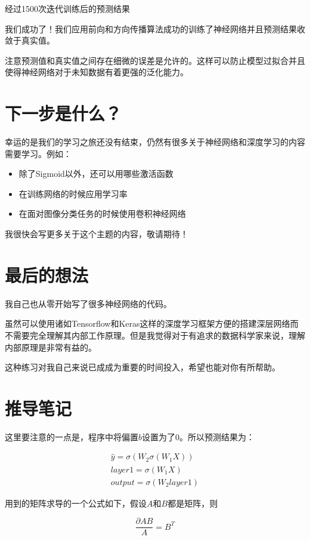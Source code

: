 经过1500次迭代训练后的预测结果

我们成功了！我们应用前向和方向传播算法成功的训练了神经网络并且预测结果收敛于真实值。

注意预测值和真实值之间存在细微的误差是允许的。这样可以防止模型过拟合并且使得神经网络对于未知数据有着更强的泛化能力。

\section{下一步是什么？}

幸运的是我们的学习之旅还没有结束，仍然有很多关于神经网络和深度学习的内容需要学习。例如：

\begin{itemize}
    \item 除了Sigmoid以外，还可以用哪些激活函数
    \item 在训练网络的时候应用学习率
    \item 在面对图像分类任务的时候使用卷积神经网络
\end{itemize}

我很快会写更多关于这个主题的内容，敬请期待！

\section{最后的想法}

我自己也从零开始写了很多神经网络的代码。

虽然可以使用诸如Tensorflow和Keras这样的深度学习框架方便的搭建深层网络而不需要完全理解其内部工作原理。但是我觉得对于有追求的数据科学家来说，理解内部原理是非常有益的。

这种练习对我自己来说已成成为重要的时间投入，希望也能对你有所帮助。

\section{推导笔记}

这里要注意的一点是，程序中将偏置$b$设置为了$0$。所以预测结果为：

\begin{align*}
    \hat{y} = \sigma (W_2 \sigma(W_1 X)) \\
    layer1 = \sigma(W_1 X) \\
    output = \sigma(W_2 layer1)
\end{align*}

用到的矩阵求导的一个公式如下，假设$A$和$B$都是矩阵，则

\begin{equation}
    \frac{\partial AB}{A} = B^T
\end{equation}